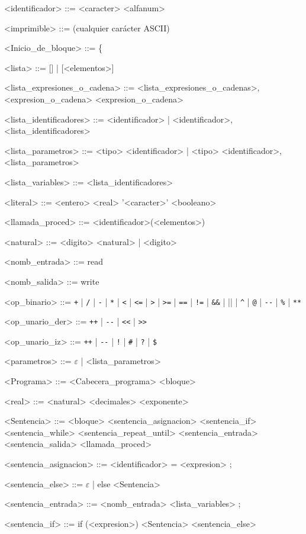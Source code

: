 \documentclass{scrartcl}
\begin{document}
\begin{grammar}
<identificador> ::= <caracter> <alfanum>

<imprimible> ::= (cualquier carácter ASCII)

<Inicio_de_bloque> ::= \{

<lista> ::= [] | [<elementos>]

<lista_expresiones_o_cadena> ::= <lista_expresiones_o_cadenas>, <expresion_o_cadena>
\alt <expresion_o_cadena>

<lista_identificadores> ::= <identificador> | <identificador>, <lista_identificadores>

<lista_parametros> ::= <tipo> <identificador> | <tipo> <identificador>, <lista_parametros>

<lista_variables> ::= <lista_identificadores>

<literal> ::= <entero> 
\alt <real> 
\alt '<caracter>' 
\alt <booleano> 

<llamada_proced> ::= <identificador>(<elementos>)

<natural> ::= <digito> <natural> | <digito>

<nomb_entrada> ::= read

<nomb_salida> ::= write

<op_binario> ::= \verb|+| | \verb|/| | \verb|-| | \verb|*| | \verb|<| | \verb|<=| | \verb|>| | \verb|>=| | \verb|==| | \verb|!=| | \verb|&&| | \verb|||| | \verb|^| | \verb|@| | \verb|--| | \verb|%| | \verb|**|

<op_unario_der> ::= \verb|++| | \verb|--| | \verb|<<| | \verb|>>|

<op_unario_iz> ::= \verb|++| | \verb|--| | \verb|!| | \verb|#| | \verb|?| | \verb|$|

<parametros> ::= $\varepsilon$ | <lista_parametros>

<Programa> ::= <Cabecera_programa> <bloque>

<real> ::= <natural> <decimales> <exponente>

<Sentencia> ::= <bloque>
\alt <sentencia_asignacion>
\alt <sentencia_if>
\alt <sentencia_while>
\alt <sentencia_repeat_until>
\alt <sentencia_entrada>
\alt <sentencia_salida>
\alt <llamada_proced>

<sentencia_asignacion> ::=  <identificador> = <expresion> ;

<sentencia_else> ::= $\varepsilon$ | else <Sentencia>

<sentencia_entrada> ::= <nomb_entrada> <lista_variables> ;

<sentencia_if> ::= if (<expresion>) <Sentencia> <sentencia_else>


\end{grammar}
\end{document}
